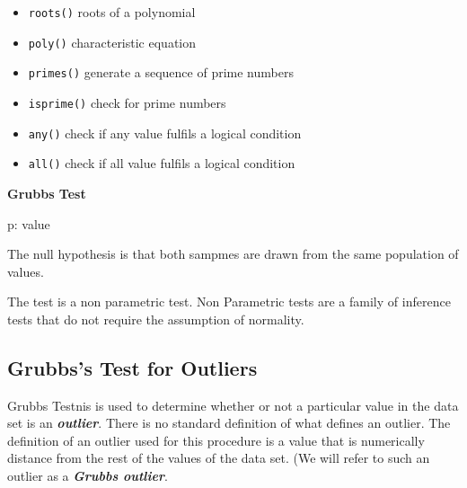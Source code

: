 \documentclass[12pt]{article} %
\begin{document}

\newpage










\begin{itemize}
\item \texttt{roots()} roots of a polynomial
\item \texttt{poly()} characteristic equation
\item \texttt{primes()} generate a sequence of prime numbers
\item \texttt{isprime()} check for prime numbers
\item \texttt{any()} check if any value fulfils a logical condition
\item \texttt{all()} check if all value fulfils a logical condition
\end{itemize}

 \newpage

\textbf{Grubbs Test}

p: value



The null hypothesis is that both sampmes are drawn from the same population of values.

The test is a non parametric test. Non Parametric tests are a family of inference tests that do not require the assumption of normality.
\subsection{Grubbs's Test for Outliers}
Grubbs Testnis is used to determine whether or not a particular value in the data set is an \textbf{\textit{outlier}}. There is no standard definition of what defines an outlier. The definition of an outlier used for this procedure is a value that is numerically distance from the rest of the values of the data set. (We will refer to such an outlier as a \textbf{\textit{Grubbs outlier}}.
\end{document}
